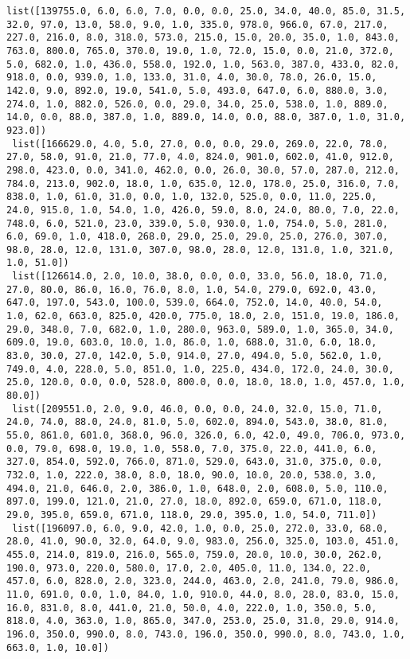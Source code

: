 \documentclass[11pt]{article}
\begin{document}
\begin{Verbatim}[commandchars=\\\{\}]
 list([139755.0, 6.0, 6.0, 7.0, 0.0, 0.0, 25.0, 34.0, 40.0, 85.0, 31.5, 32.0, 97.0, 13.0, 58.0, 9.0, 1.0, 335.0, 978.0, 966.0, 67.0, 217.0, 227.0, 216.0, 8.0, 318.0, 573.0, 215.0, 15.0, 20.0, 35.0, 1.0, 843.0, 763.0, 800.0, 765.0, 370.0, 19.0, 1.0, 72.0, 15.0, 0.0, 21.0, 372.0, 5.0, 682.0, 1.0, 436.0, 558.0, 192.0, 1.0, 563.0, 387.0, 433.0, 82.0, 918.0, 0.0, 939.0, 1.0, 133.0, 31.0, 4.0, 30.0, 78.0, 26.0, 15.0, 142.0, 9.0, 892.0, 19.0, 541.0, 5.0, 493.0, 647.0, 6.0, 880.0, 3.0, 274.0, 1.0, 882.0, 526.0, 0.0, 29.0, 34.0, 25.0, 538.0, 1.0, 889.0, 14.0, 0.0, 88.0, 387.0, 1.0, 889.0, 14.0, 0.0, 88.0, 387.0, 1.0, 31.0, 923.0])
 list([166629.0, 4.0, 5.0, 27.0, 0.0, 0.0, 29.0, 269.0, 22.0, 78.0, 27.0, 58.0, 91.0, 21.0, 77.0, 4.0, 824.0, 901.0, 602.0, 41.0, 912.0, 298.0, 423.0, 0.0, 341.0, 462.0, 0.0, 26.0, 30.0, 57.0, 287.0, 212.0, 784.0, 213.0, 902.0, 18.0, 1.0, 635.0, 12.0, 178.0, 25.0, 316.0, 7.0, 838.0, 1.0, 61.0, 31.0, 0.0, 1.0, 132.0, 525.0, 0.0, 11.0, 225.0, 24.0, 915.0, 1.0, 54.0, 1.0, 426.0, 59.0, 8.0, 24.0, 80.0, 7.0, 22.0, 748.0, 6.0, 521.0, 23.0, 339.0, 5.0, 930.0, 1.0, 754.0, 5.0, 281.0, 6.0, 69.0, 1.0, 418.0, 268.0, 29.0, 25.0, 29.0, 25.0, 276.0, 307.0, 98.0, 28.0, 12.0, 131.0, 307.0, 98.0, 28.0, 12.0, 131.0, 1.0, 321.0, 1.0, 51.0])
 list([126614.0, 2.0, 10.0, 38.0, 0.0, 0.0, 33.0, 56.0, 18.0, 71.0, 27.0, 80.0, 86.0, 16.0, 76.0, 8.0, 1.0, 54.0, 279.0, 692.0, 43.0, 647.0, 197.0, 543.0, 100.0, 539.0, 664.0, 752.0, 14.0, 40.0, 54.0, 1.0, 62.0, 663.0, 825.0, 420.0, 775.0, 18.0, 2.0, 151.0, 19.0, 186.0, 29.0, 348.0, 7.0, 682.0, 1.0, 280.0, 963.0, 589.0, 1.0, 365.0, 34.0, 609.0, 19.0, 603.0, 10.0, 1.0, 86.0, 1.0, 688.0, 31.0, 6.0, 18.0, 83.0, 30.0, 27.0, 142.0, 5.0, 914.0, 27.0, 494.0, 5.0, 562.0, 1.0, 749.0, 4.0, 228.0, 5.0, 851.0, 1.0, 225.0, 434.0, 172.0, 24.0, 30.0, 25.0, 120.0, 0.0, 0.0, 528.0, 800.0, 0.0, 18.0, 18.0, 1.0, 457.0, 1.0, 80.0])
 list([209551.0, 2.0, 9.0, 46.0, 0.0, 0.0, 24.0, 32.0, 15.0, 71.0, 24.0, 74.0, 88.0, 24.0, 81.0, 5.0, 602.0, 894.0, 543.0, 38.0, 81.0, 55.0, 861.0, 601.0, 368.0, 96.0, 326.0, 6.0, 42.0, 49.0, 706.0, 973.0, 0.0, 79.0, 698.0, 19.0, 1.0, 558.0, 7.0, 375.0, 22.0, 441.0, 6.0, 327.0, 854.0, 592.0, 766.0, 871.0, 529.0, 643.0, 31.0, 375.0, 0.0, 732.0, 1.0, 222.0, 38.0, 8.0, 18.0, 90.0, 10.0, 20.0, 538.0, 3.0, 494.0, 21.0, 646.0, 2.0, 386.0, 1.0, 648.0, 2.0, 608.0, 5.0, 110.0, 897.0, 199.0, 121.0, 21.0, 27.0, 18.0, 892.0, 659.0, 671.0, 118.0, 29.0, 395.0, 659.0, 671.0, 118.0, 29.0, 395.0, 1.0, 54.0, 711.0])
 list([196097.0, 6.0, 9.0, 42.0, 1.0, 0.0, 25.0, 272.0, 33.0, 68.0, 28.0, 41.0, 90.0, 32.0, 64.0, 9.0, 983.0, 256.0, 325.0, 103.0, 451.0, 455.0, 214.0, 819.0, 216.0, 565.0, 759.0, 20.0, 10.0, 30.0, 262.0, 190.0, 973.0, 220.0, 580.0, 17.0, 2.0, 405.0, 11.0, 134.0, 22.0, 457.0, 6.0, 828.0, 2.0, 323.0, 244.0, 463.0, 2.0, 241.0, 79.0, 986.0, 11.0, 691.0, 0.0, 1.0, 84.0, 1.0, 910.0, 44.0, 8.0, 28.0, 83.0, 15.0, 16.0, 831.0, 8.0, 441.0, 21.0, 50.0, 4.0, 222.0, 1.0, 350.0, 5.0, 818.0, 4.0, 363.0, 1.0, 865.0, 347.0, 253.0, 25.0, 31.0, 29.0, 914.0, 196.0, 350.0, 990.0, 8.0, 743.0, 196.0, 350.0, 990.0, 8.0, 743.0, 1.0, 663.0, 1.0, 10.0])

\end{Verbatim}
\end{document}
